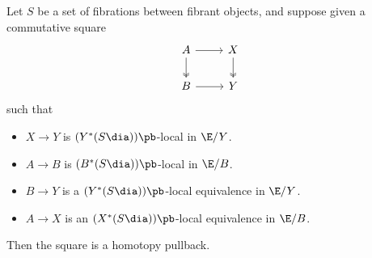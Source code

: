 \begin{lem}\label{thm:conn-modal-pb}
  Let $S$ be a set of fibrations between fibrant objects, and
  suppose given a commutative square
  \[
    \begin{tikzcd}
      A \ar[r] \ar[d,two heads] & X \ar[d,two heads] \\
      B \ar[r] & Y
    \end{tikzcd}
  \]
  such that
  \begin{itemize}
  \item $X\to Y$ is $(Y^*(S\dia))\pb$-local in $\E/Y$.
  \item $A\to B$ is $(B^*(S\dia))\pb$-local in $\E/B$.
  \item $B\to Y$ is a $(Y^*(S\dia))\pb$-local equivalence in $\E/Y$.
  \item $A\to X$ is an $(X^*(S\dia))\pb$-local equivalence in $\E/B$.
  \end{itemize}
  Then the square is a homotopy pullback.
\end{lem}
